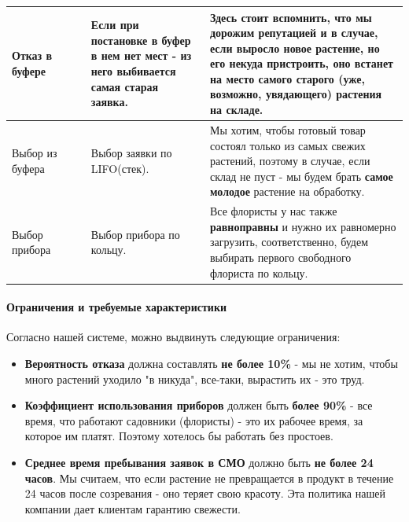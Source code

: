 \documentclass[a4paper, 14pt]{article}
\begin{document}
\begin{center}
\begin{tabular}{|p{0.2\linewidth} | p{0.3\linewidth}| p{0.5\linewidth}|}
		\hline
		Отказ в буфере     & Если при постановке в буфер в нем нет мест - из него выбивается самая старая заявка. & Здесь стоит вспомнить, что мы дорожим репутацией и в случае, если выросло новое растение, но его некуда пристроить, оно встанет на место \textbf{самого старого} (уже, возможно, увядающего) растения на складе.                                                                                                                                                                 \\
		\hline
		Выбор из буфера    & Выбор заявки по LIFO(стек).                                                          & Мы хотим, чтобы готовый товар состоял только из самых свежих растений, поэтому в случае, если склад не пуст - мы будем брать \textbf{самое молодое} растение на обработку.                                                                                                                                                                                                       \\
		\hline
		Выбор прибора      & Выбор прибора по кольцу.                                                             & Все флористы у нас также \textbf{равноправны} и нужно их равномерно загрузить, соответственно, будем выбирать первого свободного флориста по кольцу.                                                                                                                                                                                                                             \\
		\hline
	\end{tabular}
\end{center}

\paragraph{Ограничения и требуемые характеристики}

Согласно нашей системе, можно выдвинуть следующие ограничения:

\begin{itemize}
	\item \textbf{Вероятность отказа} должна составлять \textbf{не более 10\%} - мы не хотим, чтобы много растений уходило "в никуда", все-таки, вырастить их - это труд.
	\item \textbf{Коэффициент использования приборов} должен быть \textbf{более 90\%} - все время, что работают садовники (флористы) - это их рабочее время, за которое им платят. Поэтому хотелось бы работать без простоев.
	\item \textbf{Среднее время пребывания заявок в СМО} должно быть \textbf{не более 24 часов}. Мы считаем, что если растение не превращается в продукт в течение 24 часов после созревания - оно теряет свою красоту. Эта политика нашей компании дает клиентам гарантию свежести.
\end{itemize}
\end{document}
